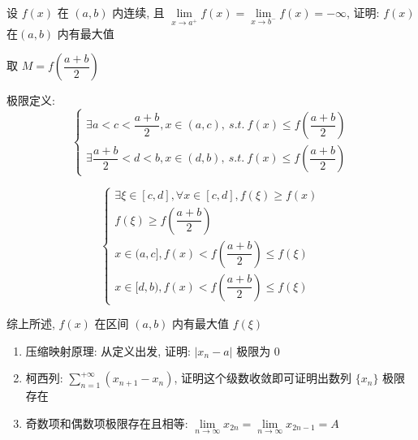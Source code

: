 \begin{proposition}
	设 $f(x)$ 在 $(a,b)$ 内连续, 且 $\lim\limits_{x\rightarrow a^{+}}f(x)=\lim\limits_{x\rightarrow b^{-}}f(x)=-\infty$, 证明: $f(x)$在$(a,b)$ 内有最大值
\end{proposition}
\begin{solution}
	
	取 $M=f(\dfrac{a+b}{2})$
	
	极限定义:  
	$$\begin{cases}
		\exists a < c < \dfrac{a+b}{2},x\in(a,c),\ s.t.\ f(x)\leq f(\dfrac{a+b}{2})\\
		\exists \dfrac{a+b}{2} < d < b,x\in(d,b),\ s.t.\ f(x)\leq f(\dfrac{a+b}{2})
	\end{cases}$$
	
	$$\begin{cases}
		\exists \xi\in [c,d], \forall x\in [c,d], f(\xi)\geq f(x)\\
		f(\xi) \geq f(\dfrac{a+b}{2})\\
		x\in (a,c], f(x) < f(\dfrac{a+b}{2}) \leq f(\xi)\\
		x\in [d,b), f(x) < f(\dfrac{a+b}{2}) \leq f(\xi)
	\end{cases}$$
	
	综上所述, $f(x)$ 在区间 $(a,b)$ 内有最大值 $f(\xi)$
\end{solution}

\begin{lemma}[不单调数列极限]
\begin{enumerate}
	\item 压缩映射原理: 从定义出发, 证明: $|x_{n}-a|$ 极限为 $0$
	\item 柯西列: $\sum\limits_{n=1}^{+\infty}(x_{n+1}-x_{n})$, 证明这个级数收敛即可证明出数列 $\{x_{n}\}$ 极限存在
	\item 奇数项和偶数项极限存在且相等: $\lim\limits_{n\to\infty}x_{2n}=\lim\limits_{n\to\infty}x_{2n-1}=A$
\end{enumerate} 
\end{lemma}

